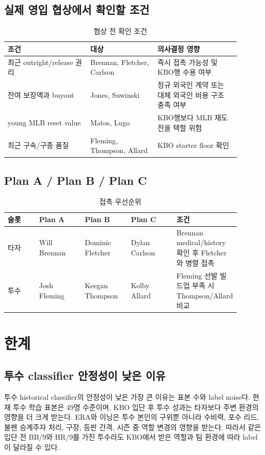 \documentclass[11pt,a4paper]{article}
\begin{document}
\subsection{실제 영입 협상에서 확인할 조건}
\begin{table}[H]
\centering
\caption{협상 전 확인 조건}
\label{tab:negotiation_checks}
\small
\begin{tabularx}{\linewidth}{L{0.32\linewidth}L{0.26\linewidth}L{0.32\linewidth}}
\toprule
조건 & 대상 & 의사결정 영향 \\
\midrule
최근 outright/release 권리 & Brennan, Fletcher, Carlson & 즉시 접촉 가능성 및 KBO행 수용 여부 \\
잔여 보장액과 buyout & Jones, Suwinski & 정규 외국인 계약 또는 대체 외국인 비용 구조 충족 여부 \\
young MLB reset value & Matos, Lugo & KBO행보다 MLB 재도전을 택할 위험 \\
최근 구속/구종 품질 & Fleming, Thompson, Allard & KBO starter floor 확인 \\
\bottomrule
\end{tabularx}
\end{table}

\subsection{Plan A / Plan B / Plan C}
\begin{table}[H]
\centering
\caption{접촉 우선순위}
\label{tab:plans}
\small
\begin{tabularx}{\linewidth}{L{0.14\linewidth}L{0.20\linewidth}L{0.20\linewidth}L{0.20\linewidth}L{0.16\linewidth}}
\toprule
슬롯 & Plan A & Plan B & Plan C & 조건 \\
\midrule
타자 & Will Brennan & Dominic Fletcher & Dylan Carlson & Brennan medical/history 확인 후 Fletcher와 병렬 접촉 \\
투수 & Josh Fleming & Keegan Thompson & Kolby Allard & Fleming 선발 빌드업 부족 시 Thompson/Allard 비교 \\
\bottomrule
\end{tabularx}
\end{table}

\section{한계}

\subsection{투수 classifier 안정성이 낮은 이유}
투수 historical classifier의 안정성이 낮은 가장 큰 이유는 표본 수와 label noise다. 현재 투수 학습 표본은 49명 수준이며, KBO 입단 후 투수 성과는 타자보다 주변 환경의 영향을 더 크게 받는다. ERA와 이닝은 투수 본인의 구위뿐 아니라 수비력, 포수 리드, 불펜 승계주자 처리, 구장, 등판 간격, 시즌 중 역할 변경의 영향을 받는다. 따라서 같은 입단 전 BB/9와 HR/9를 가진 투수라도 KBO에서 받은 역할과 팀 환경에 따라 label이 달라질 수 있다.
\end{document}

